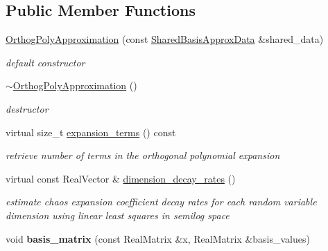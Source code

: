 \subsection*{Public Member Functions}
\begin{DoxyCompactItemize}
\item 
\hyperlink{classPecos_1_1OrthogPolyApproximation_ac035faa53ad34098ac86dbd6b71e65ee}{Orthog\+Poly\+Approximation} (const \hyperlink{classPecos_1_1SharedBasisApproxData}{Shared\+Basis\+Approx\+Data} \&shared\+\_\+data)\label{classPecos_1_1OrthogPolyApproximation_ac035faa53ad34098ac86dbd6b71e65ee}

\begin{DoxyCompactList}\small\item\em default constructor \end{DoxyCompactList}\item 
\hyperlink{classPecos_1_1OrthogPolyApproximation_a50dc870dba75b5030aeb9870e5e6aa3c}{$\sim$\+Orthog\+Poly\+Approximation} ()\label{classPecos_1_1OrthogPolyApproximation_a50dc870dba75b5030aeb9870e5e6aa3c}

\begin{DoxyCompactList}\small\item\em destructor \end{DoxyCompactList}\item 
virtual size\+\_\+t \hyperlink{classPecos_1_1OrthogPolyApproximation_a1472574cce875722141b69b4eb629572}{expansion\+\_\+terms} () const 
\begin{DoxyCompactList}\small\item\em retrieve number of terms in the orthogonal polynomial expansion \end{DoxyCompactList}\item 
virtual const Real\+Vector \& \hyperlink{classPecos_1_1OrthogPolyApproximation_af479d04cda6ec328a589f1b63ddb37eb}{dimension\+\_\+decay\+\_\+rates} ()\label{classPecos_1_1OrthogPolyApproximation_af479d04cda6ec328a589f1b63ddb37eb}

\begin{DoxyCompactList}\small\item\em estimate chaos expansion coefficient decay rates for each random variable dimension using linear least squares in semilog space \end{DoxyCompactList}\item 
void {\bfseries basis\+\_\+matrix} (const Real\+Matrix \&x, Real\+Matrix \&basis\+\_\+values)\label{classPecos_1_1OrthogPolyApproximation_ad7879e5a6e4cc3acfd6e26cb25edefde}

\end{DoxyCompactItemize}
